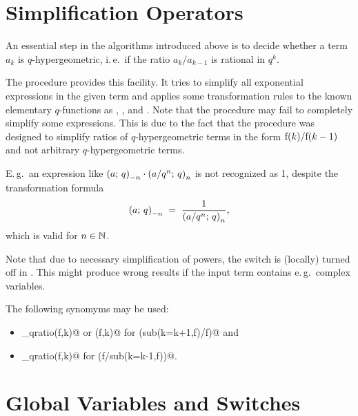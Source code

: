 \section{Simplification Operators}
\label{simplification}

An essential step in the algorithms introduced above is to decide
whether a term $a_k$ is $q$-hypergeometric, i.\,e.\ if the
ratio $a_{k}/a_{k-1}$ is rational in $q^k$.

The procedure \verb@qsimpcomb@ provides this facility. It tries to
simplify all exponential expressions in the given term and applies
some transformation rules to the known elementary $q$-functions
as \verb@qpochhammer@, \verb@qbrackets@, \verb@qbinomial@
and \verb@qfactorial@. Note that the procedure may fail to
completely simplify some expressions. This is due to the fact that the
procedure was designed to simplify ratios of $q$-hypergeometric
terms in the form ${\mathrm f}(k)/{\mathrm f}(k-1)$ and not arbitrary 
$q$-hypergeometric terms. 

E.\,g.\ an expression like 
$\left(a;\,q\right)_{-n}\cdot\left(a/q^n;\,q\right)_{n}$
is not recognized as 1, despite the transformation formula
\[ \left(a;\,q\right)_{-n} \;=\; \frac{1}{\left(a/q^n;\,q\right)_{n}},\]
which is valid for $n\in\Bbb N$.

Note that due to necessary simplification of powers, the switch
\verb@precise@ is (locally) turned off in \verb@qsimpcomb@. This
might produce wrong results if the input term contains 
e.\,g.\ complex variables.

The following synomyms may be used:
\begin{itemize}
	\item \verb@up_qratio(f,k)@ or \verb@qratio(f,k)@ for
		\verb@qsimpcomb(sub(k=k+1,f)/f)@ and
	\item \verb@down_qratio(f,k)@ for \verb@qsimpcomp(f/sub(k=k-1,f))@.
\end{itemize}


\section{Global Variables and Switches}
\label{switches}

